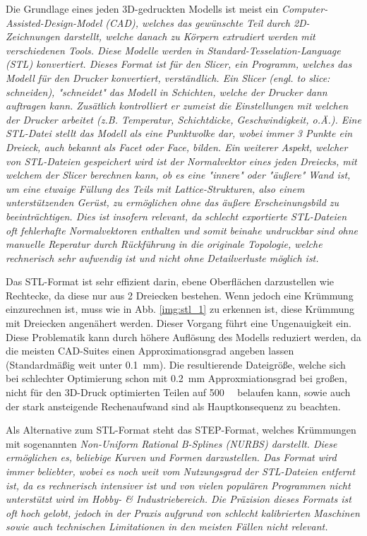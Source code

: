 \documentclass[../main.tex]{subfiles}
\begin{document}
Die Grundlage eines jeden 3D-gedruckten Modells ist meist ein \it{Computer-Assisted-Design-Model} (CAD), welches das gewünschte Teil durch 2D-Zeichnungen darstellt, welche danach zu Körpern extrudiert werden mit verschiedenen Tools. Diese Modelle werden  in \it{Standard-Tesselation-Language} (STL) konvertiert. Dieses Format ist für den \it{Slicer}, ein Programm, welches das Modell für den Drucker konvertiert, verständlich. Ein Slicer (engl. \it{to slice}: schneiden), "schneidet" das Modell in Schichten, welche der Drucker dann auftragen kann. Zusätlich kontrolliert er zumeist die Einstellungen mit welchen der Drucker arbeitet (z.B. Temperatur, Schichtdicke, Geschwindigkeit, o.Ä.). Eine STL-Datei stellt das Modell als eine Punktwolke dar, wobei immer 3 Punkte ein Dreieck, auch bekannt als \it{Facet} oder \it{Face}, bilden. Ein weiterer Aspekt, welcher von STL-Dateien gespeichert wird ist der Normalvektor eines jeden Dreiecks, mit welchem der Slicer berechnen kann, ob es eine "innere" oder "äußere" Wand ist, um eine etwaige Füllung des Teils mit \it{Lattice}-Strukturen, also einem unterstützenden Gerüst, zu ermöglichen ohne das äußere Erscheinungsbild zu beeinträchtigen. Dies ist insofern relevant, da schlecht exportierte STL-Dateien oft fehlerhafte Normalvektoren enthalten und somit beinahe undruckbar sind ohne manuelle Reperatur durch Rückführung in die originale Topologie, welche rechnerisch sehr aufwendig ist und nicht ohne Detailverluste möglich ist.

Das STL-Format ist sehr effizient darin, ebene Oberflächen darzustellen wie Rechtecke, da diese nur aus 2 Dreiecken bestehen. Wenn jedoch eine Krümmung einzurechnen ist, muss wie in Abb. \ref{img:stl_1} zu erkennen ist, diese Krümmung mit Dreiecken angenähert werden. Dieser Vorgang führt eine Ungenauigkeit ein. Diese Problematik kann durch höhere Auflösung des Modells reduziert werden, da die meisten CAD-Suites einen Approximationsgrad angeben lassen (Standardmäßig weit unter \qty{0.1}{\milli\meter}). Die resultierende Dateigröße, welche sich bei schlechter Optimierung schon mit \qty{0.2}{\milli\meter} Approxmiationsgrad bei großen, nicht für den 3D-Druck optimierten Teilen auf \qty{500}{\mega\byte} belaufen kann, sowie auch der stark ansteigende Rechenaufwand sind als Hauptkonsequenz zu beachten. \parencite{ADOBLESTL} 

Als Alternative zum STL-Format steht das STEP-Format, welches Krümmungen mit sogenannten \it{Non-Uniform Rational B-Splines (NURBS)} darstellt.
Diese ermöglichen es, beliebige Kurven und Formen darzustellen. Das Format wird immer beliebter, wobei es noch weit vom Nutzungsgrad der STL-Dateien entfernt ist, da es rechnerisch intensiver ist und von vielen populären Programmen nicht unterstützt wird im Hobby- \& Industriebereich. Die Präzision dieses Formats ist oft hoch gelobt, jedoch in der Praxis aufgrund von schlecht kalibrierten Maschinen sowie auch technischen Limitationen in den meisten Fällen nicht relevant. \parencite{ADOBESTEP}
\end{document}
